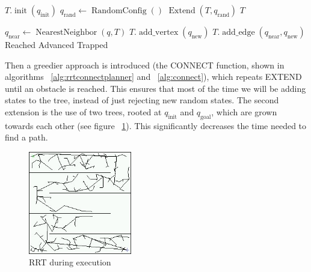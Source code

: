 \begin{algorithm}[ht!]
    \caption{$\operatorname{BuildRRT}(q_{\text{init}},q_{\text{goal}})$}
    \label{alg:buildrrt}
    \begin{algorithmic}[1]
        \STATE \(T.\operatorname{init}(q_{\text{init}})\)
            \STATE \(q_{\text{rand}} \leftarrow \operatorname{RandomConfig}()\)
            \STATE \(\operatorname{Extend}(T,q_{\text{rand}})\)
        \ENDWHILE
        \RETURN \(T\)
    \end{algorithmic}
\end{algorithm}

\begin{algorithm}[ht!]
    \caption{$\operatorname{Extend}(T,q)$}
    \label{alg:extend}
    \begin{algorithmic}[1]
        \STATE \(q_{\text{near}} \leftarrow \operatorname{NearestNeighbor}(q,T)\)
            \STATE \(T.\operatorname{add\_vertex}(q_{\text{new}})\)
            \STATE \(T.\operatorname{add\_edge}(q_{\text{near}},q_{\text{new}})\)
                \RETURN Reached
            \ELSE
                \RETURN Advanced
            \ENDIF
        \ENDIF
        \RETURN Trapped
    \end{algorithmic}
\end{algorithm}
Then a
greedier approach is introduced (the CONNECT function, shown in algorithms~%
\ref{alg:rrtconnectplanner} and~%
\ref{alg:connect}), which repeats EXTEND until
an obstacle is reached. This ensures that most of the time we
will be adding states to the tree, instead of just rejecting new random states.
The second extension is the use of two trees, rooted at \(q_{\text{init}}\) and
\(q_{\text{goal}}\), which are grown towards each other (see figure~%
\ref{fig:rrt}). This significantly decreases the
time needed to find a path.

\begin{figure}[ht!]
\begin{center}
\includegraphics[width=0.4\textwidth]{images/RRT}
\caption{RRT during execution}
\label{fig:rrt}
\end{center}
\end{figure}

